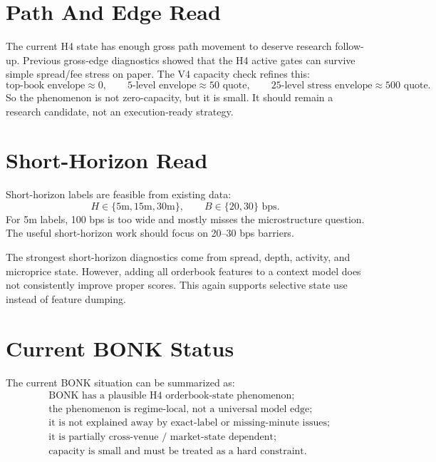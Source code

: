 \documentclass[11pt]{article}
\begin{document}
\section{Path And Edge Read}

The current H4 state has enough gross path movement to deserve research follow-up. Previous gross-edge diagnostics showed that the H4 active gates can survive simple spread/fee stress on paper. The V4 capacity check refines this:
\[
  \text{top-book envelope} \approx 0,
  \qquad
  \text{5-level envelope} \approx 50 \text{ quote},
  \qquad
  \text{25-level stress envelope} \approx 500 \text{ quote}.
\]
So the phenomenon is not zero-capacity, but it is small. It should remain a research candidate, not an execution-ready strategy.

\section{Short-Horizon Read}

Short-horizon labels are feasible from existing data:
\[
  H \in \{5\text{m},15\text{m},30\text{m}\}, \qquad
  B \in \{20,30\}\text{ bps}.
\]
For 5m labels, 100 bps is too wide and mostly misses the microstructure question. The useful short-horizon work should focus on 20--30 bps barriers.

The strongest short-horizon diagnostics come from spread, depth, activity, and microprice state. However, adding all orderbook features to a context model does not consistently improve proper scores. This again supports selective state use instead of feature dumping.

\section{Current BONK Status}

The current BONK situation can be summarized as:
\[
\boxed{
\begin{aligned}
&\text{BONK has a plausible H4 orderbook-state phenomenon;}\\
&\text{the phenomenon is regime-local, not a universal model edge;}\\
&\text{it is not explained away by exact-label or missing-minute issues;}\\
&\text{it is partially cross-venue / market-state dependent;}\\
&\text{capacity is small and must be treated as a hard constraint.}
\end{aligned}
}
\]
\end{document}

